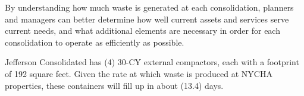 
    By understanding how much waste is generated at each consolidation, planners and managers
    can better determine how well current assets and services serve current needs, and what additional 
    elements are necessary in order for each consolidation to operate as efficiently as possible. 

    Jefferson Consolidated has (4) 30-CY external compactors, each with a footprint of 192 square feet. Given the rate at which waste is produced at NYCHA properties, these containers will fill
    up in about (13.4) days.